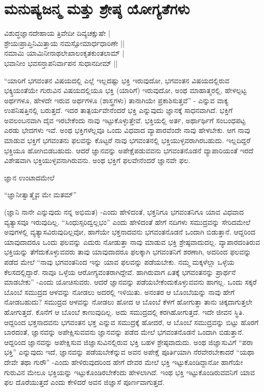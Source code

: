 \chapter{ಮನುಷ್ಯಜನ್ಮ ಮತ್ತು ಶ್ರೇಷ್ಠ ಯೋಗ್ಯತೆಗಳು}\label{chap9}

\begin{shloka}
ವಿಶುದ್ಧಜ್ಞಾನದೇಹಾಯ ತ್ರಿವೇದೀ ದಿವ್ಯಚಕ್ಷುಷೇ |\\
ಶ್ರೇಯಃಪ್ರಾಪ್ತಿನಿಮಿತ್ತಾಯ ನಮಸ್ಸೋಮಾರ್ಧಧಾರಿಣೇ ||\\
ನಮಾಮಿ ಯಾಮಿನೀನಾಥಲೇಖಾಲಂಕೃತಕುಂತಲಾಮ್ |\\
ಭವಾನೀಂ ಭವಸನ್ತಾಪನಿರ್ವಾಪನ ಸುಧಾನದೀಮ್ ||
\end{shloka}

``ಯಾರಿಗೆ ಭಗವಂತನ ವಿಷಯದಲ್ಲಿ ಎಲ್ಲೆ ಇಲ್ಲದಷ್ಟು ಭಕ್ತಿ ಇರುವುದೋ, ಭಗವಂತನ ವಿಷಯದಲ್ಲಿರುವ ಭಕ್ಕ್ತಿಯಂತೆಯೇ ಗುರುವಿನ ವಿಷಯದಲ್ಲಿಯೂ ಭಕ್ತಿ (ಯಾರಿಗೆ) ಇರುವುದೋ, ಅಂಥ ಮಾಹಾತ್ಮರಲ್ಲಿ, ಹೇಳಲ್ಪಟ್ಟ ಅರ್ಥಗಳೂ, ಹೇಳದೇ ಇರುವ ಅರ್ಥಗಳೂ (ಶಾಸ್ತ್ರಗಳು) ತಾನಾಗಿಯೇ ಪ್ರಕಾಶಿಸುತ್ತವೆ'' - ಎನ್ನುವ ವಾಕ್ಯ ಉಪನಿಷತ್ತಿನಲ್ಲಿ ಬರುತ್ತದೆ. ಇದರ ತಾತ್ಪರ್ಯವೇನೆಂದರೆ ಭಕ್ತಿ ಎನ್ನುವುದು ಜ್ಞಾನಕ್ಕೆ ಸಾಧನವಾಗಿದೆ. ಭಕ್ತಿಗೆ ಅವಲಂಬನವಾಗಿ ದೈವ ಇರಬೇಕೆಂದು ನಾವು ಇಟ್ಟುಕೊಳ್ಳುತ್ತೇವೆ. ಭಕ್ತಿಯಲ್ಲಿ ಅರ್ತ, ಅರ್ಥಾರ್ಥಿಗೆ ಸಂಬಂಧಪಟ್ಟ ಎರಡು ಭೇದಗಳು ಇವೆ. ಅಂಥ ಭಕ್ತಿಗಳೆಲ್ಲವೂ ಒಂದು ವಿಧವಾದ ವ್ಯಾಪಾರವೆಂದೇ ನಾವು ಹೇಳಬೇಕು. ಆಗ ನಾವು ಮಾಡುವ ಭಕ್ತಿಗೆ ಭಗವಂತನು ಫಲವನ್ನು ಕೊಟ್ಟರೆ ನಾವು ಭಗವಂತನಲ್ಲಿ ಭಕ್ತಿಯುಳ್ಳವರಾಗಿರಬಹುದು. ಇಲ್ಲದಿದ್ದರೆ ಭಕ್ತಿಯೂ ಹೋಗಿಬಿಡಬಹುದು. ಆದರೆ ಜ್ಞಾನವನ್ನು ಅಪೇಕ್ಷೆಪಡುವವನು ಭಗವಂತನೊಡನೆ ವ್ಯಾಪಾರಿಯಂತೆ ಇರದೆ ವಿಶೇಷವಾಗಿ ಭಕ್ತಿಯುಳ್ಳವನಾಗಿರುವನು. ಅಂಥ ಭಕ್ತಿಗೆ ಫಲವೇನೆಂದರೆ ಜ್ಞಾನವೇ ಫಲ.

ಜ್ಞಾನ ಉಂಟಾದಮೇಲೆ

\begin{shloka}
``ಜ್ಞಾನೀತ್ವಾತ್ಮೈವ ಮೇ ಮತಮ್''
\end{shloka}

(ಜ್ಞಾನಿ ನಾನೇ ಎನ್ನುವುದು ನನ್ನ ಅಭಿಮತ) -ಎಂದು ಹೇಳಿದಂತೆ, ಭಕ್ತನಿಗೂ ಭಗವಂತನಿಗೂ ಯಾವ ವಿಧವಾದ ವ್ಯತ್ಯಾಸವೂ ಇರುವುದಿಲ್ಲ. ``ಸಿಂಧುಸ್ಸರಿದ್ವಲ್ಲಭಂ'' ಎಂದು ಹೇಳಿದಂತೆ ಹೇಗೆ ನದಿಗಳು ಸಮುದ್ರವನ್ನು ಸೇರಿದಮೇಲೆ ಅವುಗಳಲ್ಲಿ ವ್ಯತ್ಯಾಸವಿರುವುದಿಲ್ಲವೋ, ಹಾಗೆಯೇ ಭಕ್ತನಾದವನು ಭಗವಂತನೊಡನೆ ಒಂದಾಗಿ ಬಿಡುತ್ತಾನೆ. ಆದ್ದರಿಂದ ಯಾವುದಾದರೂ ಒಂದು ಫಲವನ್ನು ಎದುರು ನೋಡುತ್ತಾ ನಾವು ಮಾಡುವ ಭಕ್ತಿ ಶ್ರೇಷ್ಠವಾದುದಲ್ಲ. ವ್ಯಾಪಾರದಂತಿರುವ ಭಕ್ತಿಯನ್ನು ತೆಗೆದುಕೊಳ್ಳುವವರು ತಾವು ಯಾವುದಾದರೂ ಫಲಕ್ಕಾಗಿ ಭಗವಂತನಿಗೆ ಶರಣಾಗಿ, ಅದರಿಂದ ಫಲವನ್ನು ಪಡೆದ ಮೇಲೆ ``ನಾವು ಭಗವಂತನಿಂದ ಇನ್ನು ಯಾವ ಫಲವನ್ನು ಪಡೆಯಬೇಕು. ನಮ್ಮ ಮಕ್ಕಳೆಲ್ಲಾ ಒಳ್ಳೆಯ ಕೆಲಸದಲ್ಲಿದ್ದಾರೆ. ನಾವೂ ಒಳ್ಳೆಯ ಆರೋಗ್ಯವಂತರಾಗಿದ್ದೇವೆ. ಹಾಗಿರುವಾಗ ಏತಕ್ಕೆ ಭಗವಂತನನ್ನು ಪ್ರಾರ್ಥನೆ ಮಾಡಬೇಕು'' -ಎಂದು ಯೋಚಿಸುವರು. ಆದರೆ ಜ್ಞಾನವನ್ನು ಪಡೆಯಬೇಕೆಂದುಕೊಳ್ಳುವವನು ಹಾಗಲ್ಲ. ಒಂದು ಸಕ್ಕರೆ ಬೊಂಬೆ ಸಮುದ್ರದ ಆಳವನ್ನು ನೋಡಲು ಅದರಲ್ಲಿ ಇಳಿಯಿತು. ಅನಂತರ ಆ ಬೊಂಬೆಯನ್ನು ನಾವು ಹೇಗೆ ನೋಡಬಹುದು? ಸಮುದ್ರದ ಆಳವನ್ನು ನೋಡಲು ಹೋದ ಆ ಬೊಂಬೆ ಕೆಳಗೆ ಹೋಗುತ್ತಾ ತಾನು ಚಿಕ್ಕದಾಗುತ್ತಲೇ ಹೋಗುತ್ತದೆ. ಕೊನೆಗೆ ಆ ಬೊಂಬೆ ಕಾಣುವುದಿಲ್ಲ. ಅದು ಸಮುದ್ರದಲ್ಲಿ ಕರಗಿಹೋಗುತ್ತದೆ. ಇದೇ ಜೀವನ ಸ್ಥಿತಿ. ಆದ್ದರಿಂದ ಭಕ್ತನಾದವನು ಭಗವಂತನ ಭಕ್ತ ಎನ್ನುವ ಸಮುದ್ರಕ್ಕೆ ಹೋದರೆ, ಆ ಬೊಂಬೆ ಸಮುದ್ರವನ್ನು ಬಿಟ್ಟು ಹೊರಗೆ ಬಾರದಂತೆ, ಜ್ಞಾನವನ್ನು ಅಪೇಕ್ಷಿಸುವವನು ಜ್ಞಾನವನ್ನು ಪಡೆದ ಮೇಲೆ ಭಗವಂತನೊಡನೆ ಒಂದಾಗಿ ಬಿಡುತ್ತಾನೆ. ಆದ್ದರಿಂದ ಜ್ಞಾನವನ್ನು ಅಪೇಕ್ಷಿಸುವ ಜಿಜ್ಞಾಸುವಿನಲ್ಲಿರುವ ಭಕ್ತಿ ಬಹಳ ಶ್ರೇಷ್ಠವಾದುದು. ಅಂಥ ಜಿಜ್ಞಾಸುವಿಗೆ ``ಪರಾ ಭಕ್ತಿ'' ಎನ್ನುವುದು ಇದೆ, ಜ್ಞಾನವನ್ನು ಪಡೆಯಬೇಕೆನ್ನುವ ಅವನ ಅಪೇಕ್ಷೆ ಪೂರ್ತಿಯಾಗಿ ನೆರವೇರಬೇಕಾದರೆ ``ಯಥಾ ದೇವೇ ತಥಾ ಗುರೌ'' -ಎಂದು ಹೇಳಿರುವುದರಿಂದ ಹೇಗೆ ದೇವರ ಮೇಲೆ ಭಕ್ತಿ ಇಟ್ಟುಕೊಂಡಿದ್ದಾನೋ ಹಾಗೆಯೇ ಗುರುವಿನ ಮೇಲೂ ಭಕ್ತಿಯನ್ನು ಇಟ್ಟುಕೊಂಡಿರಬೇಕೆಂದು ಹೇಳಲಾಗಿದೆ. ಇಂಥ ಭಕ್ತಿ ಇಟ್ಟುಕೊಂಡಿರುವವನಿಗೆ ಯಾವ ಫಲ ದೊರೆಯುತ್ತದೆ ಎಂದು ಕೇಳಿದರೆ ಅವನ ಜಿಜ್ಞಾಸೆ ಪೂರ್ಣವಾಗುತ್ತದೆ.

